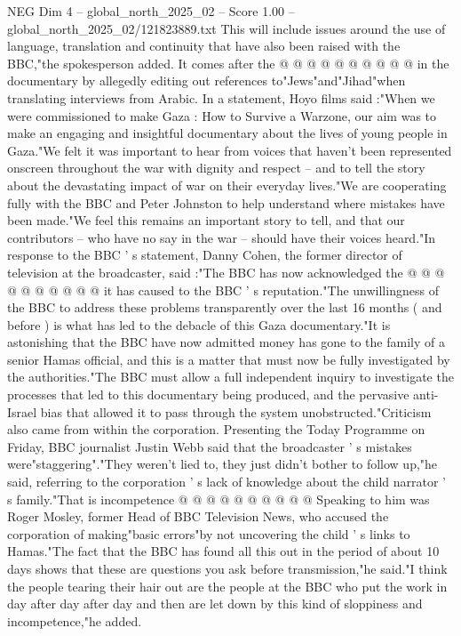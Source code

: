 \begin{textsample}{NEG Dim 4 – global\_north\_2025\_02 – Score 1.00 – global\_north\_2025\_02/121823889.txt}
This will include issues around the use of language, translation and continuity that have also been raised with the BBC,"the spokesperson added.
It comes after the @ @ @ @ @ @ @ @ @ @ in the documentary by allegedly editing out references to"Jews"and"Jihad"when translating interviews from Arabic.
In a statement, Hoyo films said :"When we were commissioned to make Gaza : How to Survive a Warzone, our aim was to make an engaging and insightful documentary about the lives of young people in Gaza."We felt it was important to hear from voices that haven't been represented onscreen throughout the war with dignity and respect -- and to tell the story about the devastating impact of war on their everyday lives."We are cooperating fully with the BBC and Peter Johnston to help understand where mistakes have been made."We feel this remains an important story to tell, and that our contributors -- who have no say in the war -- should have their voices heard."In response to the BBC ' s statement, Danny Cohen, the former director of television at the broadcaster, said :"The BBC has now acknowledged the @ @ @ @ @ @ @ @ @ @ it has caused to the BBC ' s reputation."The unwillingness of the BBC to address these problems transparently over the last 16 months ( and before ) is what has led to the debacle of this Gaza documentary."It is astonishing that the BBC have now admitted money has gone to the family of a senior Hamas official, and this is a matter that must now be fully investigated by the authorities."The BBC must allow a full independent inquiry to investigate the processes that led to this documentary being produced, and the pervasive anti-Israel bias that allowed it to pass through the system unobstructed."Criticism also came from within the corporation.
Presenting the Today Programme on Friday, BBC journalist Justin Webb said that the broadcaster ' s mistakes were"staggering"."They weren't lied to, they just didn't bother to follow up,"he said, referring to the corporation ' s lack of knowledge about the child narrator ' s family."That is incompetence @ @ @ @ @ @ @ @ @ @ Speaking to him was Roger Mosley, former Head of BBC Television News, who accused the corporation of making"basic errors"by not uncovering the child ' s links to Hamas."The fact that the BBC has found all this out in the period of about 10 days shows that these are questions you ask before transmission,"he said."I think the people tearing their hair out are the people at the BBC who put the work in day after day after day and then are let down by this kind of sloppiness and incompetence,"he added.

\end{textsample}
